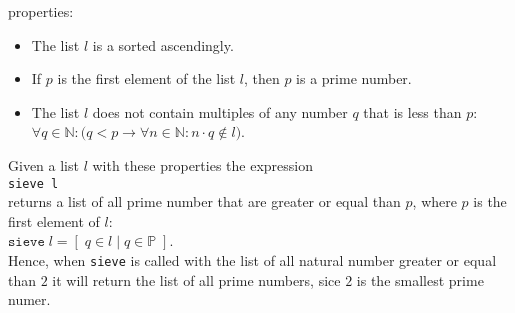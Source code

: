 \documentclass[11pt]{report}
\begin{document}
\begin{enumerate}[(a)]
  properties:
  \begin{itemize}
  \item The list $l$ is a sorted ascendingly.
  \item If $p$ is the first element of the list $l$, then $p$ is a prime number.
  \item The list $l$ does not contain multiples of any number $q$ that is less than $p$:
    \\[0.2cm]
    \hspace*{1.3cm}
    $\forall q \in \mathbb{N}: \bigl(q < p \rightarrow \forall n \in \mathbb{N}: n \cdot q \not\in l\bigr)$.
  \end{itemize}
  Given a list $l$ with these properties the expression
  \\[0.2cm]
  \hspace*{1.3cm}
  \texttt{sieve l}
  \\[0.2cm]
  returns a list of all prime number that are greater or equal than $p$, where $p$ is the first element of $l$: 
  \\[0.2cm]
  \hspace*{1.3cm}
  $\mathtt{sieve}\;l = [\; q \in l \mid q \in \mathbb{P}\;]$.
  \\[0.2cm]
  Hence, when \texttt{sieve} is called with the list of all natural number greater or equal than $2$
  it will return the list of all prime numbers, sice $2$ is the smallest  prime numer.


\end{enumerate}
\end{document}

